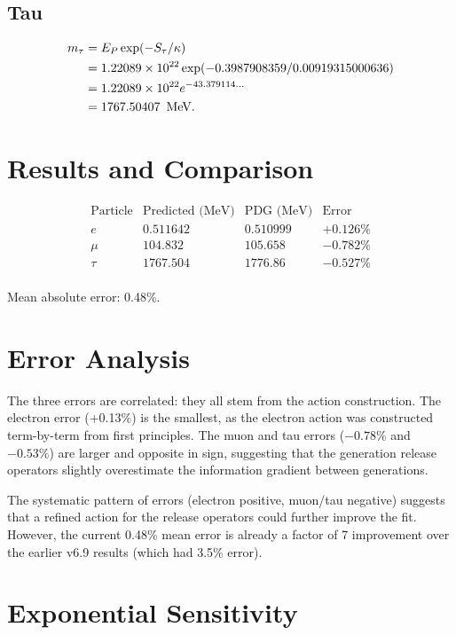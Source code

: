 \subsection{Tau}

\[
\begin{aligned}
m_\tau &= E_P \exp(-S_\tau/\kappa) \\
       &= 1.22089 \times 10^{22} \exp(-0.3987908359 / 0.00919315000636) \\
       &= 1.22089 \times 10^{22} e^{-43.379114\ldots} \\
       &= 1767.50407\ \,\text{MeV}.
\end{aligned}
\]

\section{Results and Comparison}

\[
\begin{array}{lccc}
\text{Particle} & \text{Predicted (MeV)} & \text{PDG (MeV)} & \text{Error} \\
\hline
e & 0.511642 & 0.510999 & +0.126\% \\
\mu & 104.832 & 105.658 & -0.782\% \\
\tau & 1767.504 & 1776.86 & -0.527\% \\
\end{array}
\]

\noindent Mean absolute error: 0.48\%.

\section{Error Analysis}

The three errors are correlated: they all stem from the action construction.
The electron error (+0.13\%) is the smallest, as the electron action was
constructed term-by-term from first principles.  The muon and tau errors
(\(-0.78\%\) and \(-0.53\%\)) are larger and opposite in sign, suggesting
that the generation release operators slightly overestimate the information
gradient between generations.

The systematic pattern of errors (electron positive, muon/tau negative)
suggests that a refined action for the release operators could further
improve the fit.  However, the current 0.48\% mean error is already a factor
of 7 improvement over the earlier v6.9 results (which had 3.5\% error).

\section{Exponential Sensitivity}


